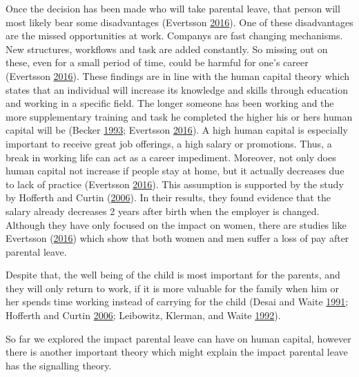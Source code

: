 \documentclass[
  12pt,
]{article}
\begin{document}
Once the decision has been made who will take parental leave, that person will most likely bear some disadvantages (Evertsson \protect\hyperlink{ref-evertsson_parental_2016}{2016}).
One of these disadvantages are the missed opportunities at work. Companys are fast changing mechanisms. New structures, workflows and task are added constantly. So missing out on these, even for a small period of time, could be harmful for one's career (Evertsson \protect\hyperlink{ref-evertsson_parental_2016}{2016}). These findings are in line with the human capital theory which states that an individual will increase its knowledge and skills through education and working in a specific field. The longer someone has been working and the more supplementary training and task he completed the higher his or hers human capital will be (Becker \protect\hyperlink{ref-becker_human_1993}{1993}; Evertsson \protect\hyperlink{ref-evertsson_parental_2016}{2016}). A high human capital is especially important to receive great job offerings, a high salary or promotions. Thus, a break in working life can act as a career impediment. Moreover, not only does human capital not increase if people stay at home, but it actually decreases due to lack of practice (Evertsson \protect\hyperlink{ref-evertsson_parental_2016}{2016}). This assumption is supported by the study by Hofferth and Curtin (\protect\hyperlink{ref-hofferth_parental_2006}{2006}). In their results, they found evidence that the salary already decreases 2 years after birth when the employer is changed. Although they have only focused on the impact on women, there are studies like Evertsson (\protect\hyperlink{ref-evertsson_parental_2016}{2016}) which show that both women and men suffer a loss of pay after parental leave.

Despite that, the well being of the child is most important for the parents, and they will only return to work, if it is more valuable for the family when him or her spends time working instead of carrying for the child (Desai and Waite \protect\hyperlink{ref-desai_womens_1991}{1991}; Hofferth and Curtin \protect\hyperlink{ref-hofferth_parental_2006}{2006}; Leibowitz, Klerman, and Waite \protect\hyperlink{ref-leibowitz_employment_1992}{1992}).

So far we explored the impact parental leave can have on human capital, however there is another important theory which might explain the impact parental leave has the signalling theory.
\end{document}
